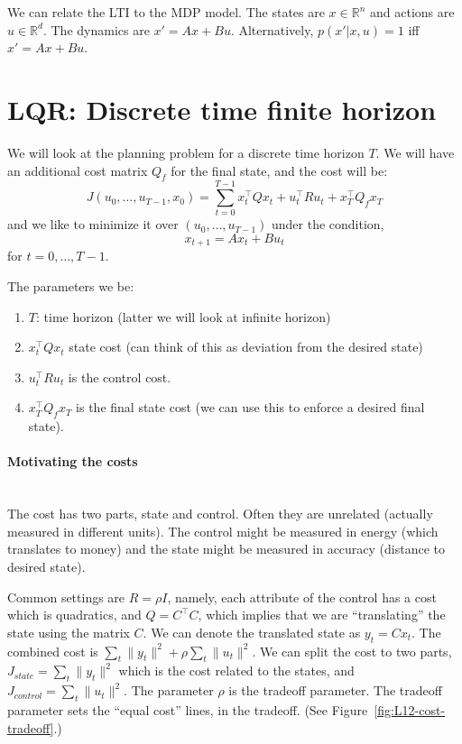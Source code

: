 We can relate the LTI to the MDP model. The states are $x\in
\mathbb{R}^n$ and actions are $u\in\mathbb{R}^d$. The dynamics are
$x'=Ax+Bu$. Alternatively, $p(x'|x,u)=1 $ iff $x'=Ax+Bu$.

\section{LQR: Discrete time finite horizon}

We will look at the planning problem for a discrete time horizon
$T$. We will have an additional cost matrix $Q_f$ for the final
state, and the cost will be:
\[
J(u_0, \ldots,u_{T-1},x_0)=\sum_{t=0}^{T-1} x_t^\top Q x_t +u_t^\top
R u_t + x_T^\top Q_f x_T
\]
and we like to minimize it over $(u_0, \ldots, u_{T-1})$ under the
condition,
\[
x_{t+1}=Ax_t+Bu_t
\]
for $t=0, \ldots, T-1$.

The parameters we be:
\begin{enumerate}
\item
$T$: time horizon (latter we will look at infinite horizon)
\item
$x_t^\top Qx_t$ state cost (can think of this as deviation from the
desired state)
\item
$u_t^\top R u_t$ is the control cost.
\item
$x_T^\top Q_f x_T$ is the final state cost (we can use this to
enforce a desired final state).
\end{enumerate}

\paragraph{Motivating the costs}\ \\

The cost has two parts, state and control. Often they are unrelated
(actually measured in different units). The control might be measured
in energy (which translates to money) and the state might be
measured in accuracy (distance to desired state).

Common settings are $R=\rho I$, namely, each attribute of the
control has a cost which is quadratics, and $Q=C^\top C$, which
implies that we are ``translating'' the state using the matrix $C$.
We can denote the translated state as $y_t =Cx_t$. The combined cost
is $\sum_t \|y_t\|^2+\rho\sum_t \|u_t\|^2$. We can split the cost to
two parts, $J_{state}=\sum_t \|y_t\|^2$ which is the cost related to
the states, and $J_{control}=\sum_t \|u_t\|^2$. The parameter $\rho$
is the tradeoff parameter. The tradeoff parameter sets the ``equal
cost'' lines, in the tradeoff. (See
Figure~\ref{fig:L12-cost-tradeoff}.)


